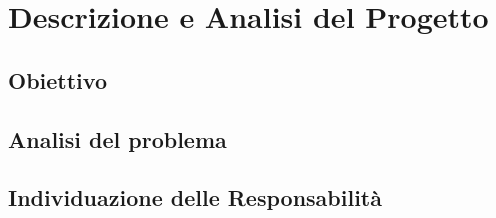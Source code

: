 \chapter{Descrizione e Analisi del Progetto}
\section{Obiettivo}
\section{Analisi del problema}
\section{Individuazione delle Responsabilità}
